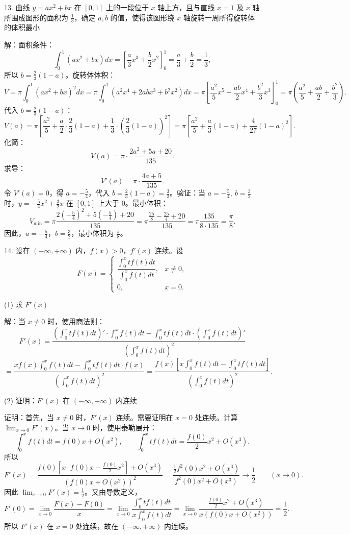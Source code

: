 13. 曲线 \(y=ax^{2}+bx\) 在 \([0,1]\) 上的一段位于 \(x\) 轴上方，且与直线 \(x=1\) 及 \(x\) 轴所围成图形的面积为 \(\frac{1}{3}\)，确定 \(a,b\) 的值，使得该图形绕 \(x\) 轴旋转一周所得旋转体的体积最小

解：面积条件：
\[ \int_{0}^{1}(ax^{2}+bx)dx=\left[\frac{a}{3}x^{3}+\frac{b}{2}x^{2}\right]_{0}^{1}=\frac{a}{3}+\frac{b}{2}=\frac{1}{3}, \]
所以 \(b=\frac{2}{3}(1-a)\)。旋转体体积：
\[ V=\pi\int_{0}^{1}(ax^{2}+bx)^{2}dx=\pi\int_{0}^{1}(a^{2}x^{4}+2abx^{3}+b^{2}x^{2})dx=\pi\left[\frac{a^{2}}{5}x^{5}+\frac{ab}{2}x^{4}+\frac{b^{2}}{3}x^{3}\right]_{0}^{1}=\pi\left(\frac{a^{2}}{5}+\frac{ab}{2}+\frac{b^{2}}{3}\right). \]
代入 \(b=\frac{2}{3}(1-a)\)：
\[ V(a)=\pi\left[\frac{a^{2}}{5}+\frac{a}{2}\cdot\frac{2}{3}(1-a)+\frac{1}{3}\cdot\left(\frac{2}{3}(1-a)\right)^{2}\right]=\pi\left[\frac{a^{2}}{5}+\frac{a}{3}(1-a)+\frac{4}{27}(1-a)^{2}\right]. \]
化简：
\[ V(a)=\pi\cdot\frac{2a^{2}+5a+20}{135}. \]
求导：
\[ V'(a)=\pi\cdot\frac{4a+5}{135}. \]
令 \(V'(a)=0\)，得 \(a=-\frac{5}{4}\)，代入 \(b=\frac{2}{3}(1-a)=\frac{3}{2}\)。验证：当 \(a=-\frac{5}{4},\ b=\frac{3}{2}\) 时，\(y=-\frac{5}{4}x^{2}+\frac{3}{2}x\) 在 \([0,1]\) 上大于 \(0\)。最小体积：
\[ V_{\min}=\pi\frac{2\left(-\frac{5}{4}\right)^{2}+5\left(-\frac{5}{4}\right)+20}{135}=\pi\frac{\frac{25}{8}-\frac{25}{4}+20}{135}=\pi\frac{135}{8\cdot135}=\frac{\pi}{8}. \]
因此，\(a=-\frac{5}{4}\)，\(b=\frac{3}{2}\)，最小体积为 \(\frac{\pi}{8}\)。

14. 设在 \((-\infty,+\infty)\) 内，\(f(x)>0\)，\(f'(x)\) 连续。设
\[ F(x)=\begin{cases}\dfrac{\int_{0}^{x}tf(t)dt}{\int_{0}^{x}f(t)dt},&x\ne0,\\ 0,&x=0.\end{cases} \]

(1) 求 \(F'(x)\)

解：当 \(x\ne0\) 时，使用商法则：
\[ F'(x)=\frac{\left(\int_{0}^{x}tf(t)dt\right)'\cdot\int_{0}^{x}f(t)dt-\int_{0}^{x}tf(t)dt\cdot\left(\int_{0}^{x}f(t)dt\right)'}{\left(\int_{0}^{x}f(t)dt\right)^{2}} \]
\[ =\frac{xf(x)\int_{0}^{x}f(t)dt-\int_{0}^{x}tf(t)dt\cdot f(x)}{\left(\int_{0}^{x}f(t)dt\right)^{2}}=\frac{f(x)\left[x\int_{0}^{x}f(t)dt-\int_{0}^{x}tf(t)dt\right]}{\left(\int_{0}^{x}f(t)dt\right)^{2}}. \]

(2) 证明：\(F'(x)\) 在 \((-\infty,+\infty)\) 内连续

证明：首先，当 \(x\ne0\) 时，\(F'(x)\) 连续。需要证明在 \(x=0\) 处连续。计算 \(\lim_{x\to0}F'(x)\)。当 \(x\to0\) 时，使用泰勒展开：
\[ \int_{0}^{x}f(t)dt=f(0)x+O(x^{2}),\qquad \int_{0}^{x}tf(t)dt=\frac{f(0)}{2}x^{2}+O(x^{3}). \]
所以
\[ F'(x)=\frac{f(0)\left[x\cdot f(0)x-\frac{f(0)}{2}x^{2}\right]+O(x^{3})}{\left(f(0)x+O(x^{2})\right)^{2}}=\frac{\frac{1}{2}f^{2}(0)x^{2}+O(x^{3})}{f^{2}(0)x^{2}+O(x^{3})}\to\frac{1}{2}\qquad(x\to0). \]
因此 \(\lim_{x\to0}F'(x)=\frac{1}{2}\)。又由导数定义，
\[ F'(0)=\lim_{x\to0}\frac{F(x)-F(0)}{x}=\lim_{x\to0}\frac{\int_{0}^{x}tf(t)dt}{x\int_{0}^{x}f(t)dt}=\lim_{x\to0}\frac{\frac{f(0)}{2}x^{2}+O(x^{3})}{x\left(f(0)x+O(x^{2})\right)}=\frac{1}{2}. \]
所以 \(F'(x)\) 在 \(x=0\) 处连续，故在 \((-\infty,+\infty)\) 内连续。

